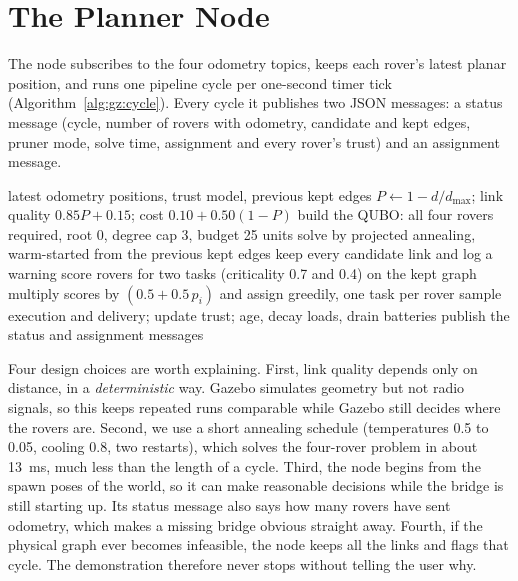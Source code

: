 \section{The Planner Node}

The node subscribes to the four odometry topics, keeps each rover's latest
planar position, and runs one pipeline cycle per one-second timer tick
(Algorithm~\ref{alg:gz:cycle}). Every cycle it publishes two JSON messages: a
status message (cycle, number of rovers with odometry, candidate and kept
edges, pruner mode, solve time, assignment and every rover's trust) and an
assignment message.

\begin{algorithm}[htbp]
\caption{One cycle of the Gazebo planner node}
\label{alg:gz:cycle}
\begin{algorithmic}[1]
\Require latest odometry positions, trust model, previous kept edges
  \State $P\gets1-d/d_{\max}$; link quality $0.85P+0.15$; cost $0.10+0.50(1-P)$
\EndFor
\State build the QUBO: all four rovers required, root 0, degree cap 3, budget 25 units
\State solve by projected annealing, warm-started from the previous kept edges
 keep every candidate link and log a warning \EndIf
\State score rovers for two tasks (criticality 0.7 and 0.4) on the kept graph
\State multiply scores by $(0.5+0.5\,p_i)$ and assign greedily, one task per rover
\State sample execution and delivery; update trust; age, decay loads, drain batteries
\State publish the status and assignment messages
\end{algorithmic}
\end{algorithm}

Four design choices are worth explaining. First, link quality depends only on
distance, in a \emph{deterministic} way. Gazebo simulates geometry but not radio
signals, so this keeps repeated runs comparable while Gazebo still decides
where the rovers are. Second, we use a short annealing schedule (temperatures
0.5 to 0.05, cooling 0.8, two restarts), which solves the four-rover problem in
about 13~ms, much less than the length of a cycle. Third, the node begins from
the spawn poses of the world, so it can make reasonable decisions while the
bridge is still starting up. Its status message also says how many rovers have
sent odometry, which makes a missing bridge obvious straight away. Fourth, if
the physical graph ever becomes infeasible, the node keeps all the links and
flags that cycle. The demonstration therefore never stops without telling the
user why.

